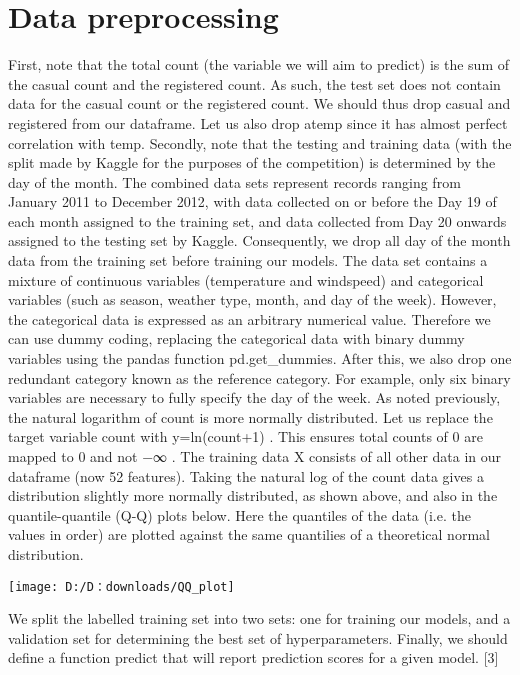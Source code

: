 \section{Data preprocessing} \label{sec-method}



\blindtext
First, note that the total count (the variable we will aim to predict) is the sum of the casual count and the registered count. As such, the test set does not contain data for the casual count or the registered count. We should thus drop casual and registered from our dataframe. Let us also drop atemp since it has almost perfect correlation with temp.
\blindtext
Secondly, note that the testing and training data (with the split made by Kaggle for the purposes of the competition) is determined by the day of the month. The combined data sets represent records ranging from January 2011 to December 2012, with data collected on or before the Day 19 of each month assigned to the training set, and data collected from Day 20 onwards assigned to the testing set by Kaggle. Consequently, we drop all day of the month data from the training set before training our models.
\blindtext
The data set contains a mixture of continuous variables (temperature and windspeed) and categorical variables (such as season, weather type, month, and day of the week). However, the categorical data is expressed as an arbitrary numerical value. Therefore we can use dummy coding, replacing the categorical data with binary dummy variables using the pandas function pd.get_dummies. After this, we also drop one redundant category known as the reference category. For example, only six binary variables are necessary to fully specify the day of the week.
\blindtext
As noted previously, the natural logarithm of count is more normally distributed. Let us replace the target variable count with  y=ln(count+1) . This ensures total counts of  0  are mapped to  0  and not  −∞ . The training data  X  consists of all other data in our dataframe (now  52  features).
\blindtext
Taking the natural log of the count data gives a distribution slightly more normally distributed, as shown above, and also in the quantile-quantile (Q-Q) plots below. Here the quantiles of the data (i.e. the values in order) are plotted against the same quantilies of a theoretical normal distribution.
\blindtext
\begin{center}
	\texttt{[image: D:/D：downloads/QQ\_plot]}
\end{center}
\blindtext
\blindtext
We split the labelled training set into two sets: one for training our models, and a validation set for determining the best set of hyperparameters.
\blindtext
Finally, we should define a function predict that will report prediction scores for a given model.
[3]
\blinditemize
\blindenumerate

